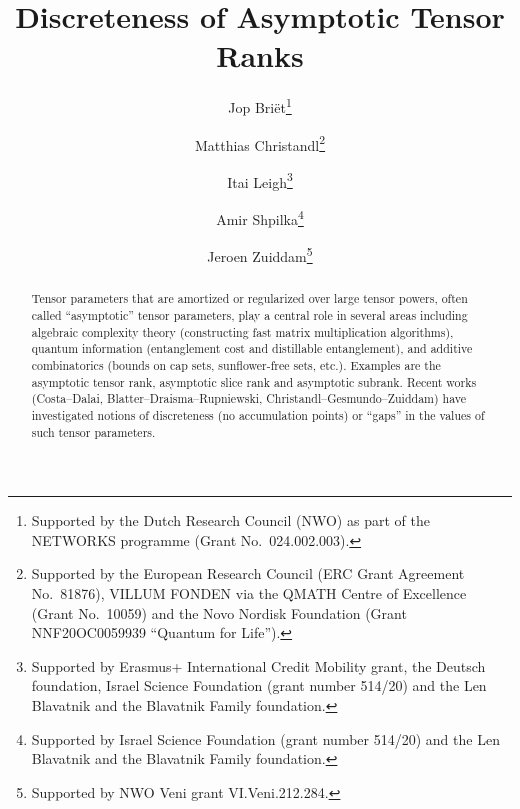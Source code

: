 \documentclass{daj}
\begin{document}
\begin{frontmatter}[classification=text]

\title{Discreteness of Asymptotic Tensor Ranks} %

\author[briet]{Jop Briët\thanks{Supported by the Dutch Research Council (NWO) as part of the NETWORKS programme (Grant No.~024.002.003).}}
\author[christandl]{Matthias Christandl\thanks{Supported by the European Research Council (ERC Grant Agreement No.~81876), VILLUM FONDEN via the QMATH Centre of Excellence (Grant No.~10059) and the Novo Nordisk Foundation (Grant NNF20OC0059939 ``Quantum for Life'').}}
\author[leigh]{Itai Leigh\thanks{Supported by Erasmus+ International Credit Mobility grant, the Deutsch foundation, Israel Science Foundation (grant number 514/20) and the Len Blavatnik and the Blavatnik Family foundation.}}
\author[shpilka]{Amir Shpilka\thanks{Supported by Israel Science Foundation (grant number 514/20) and the Len Blavatnik and the Blavatnik Family foundation.}}
\author[zuiddam]{Jeroen Zuiddam\thanks{Supported by NWO Veni grant VI.Veni.212.284.}}

\begin{abstract}
    Tensor parameters that are amortized or regularized over large tensor powers, often called ``asymptotic'' tensor parameters, play a central role in several areas including algebraic complexity theory (constructing fast matrix multiplication algorithms), quantum information (entanglement cost and distillable entanglement), and additive combinatorics (bounds on cap sets, sunflower-free sets, etc.). Examples are the asymptotic tensor rank, asymptotic slice rank and asymptotic subrank.
    Recent works (Costa--Dalai, Blatter--Draisma--Rupniewski, Christandl--Gesmundo--Zuiddam) have investigated notions of discreteness (no accumulation points) or ``gaps'' in the values of such tensor parameters. 
    

\end{abstract}
\end{frontmatter}
\end{document}
